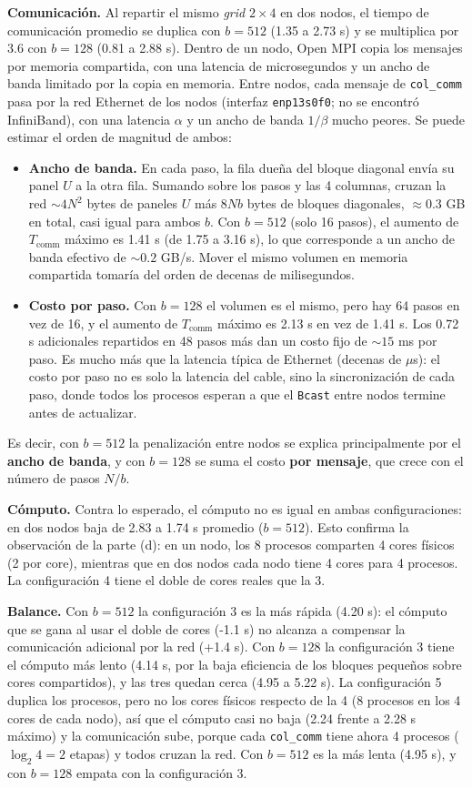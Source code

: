 \documentclass[11pt,a4paper]{article}
\newcommand{\Tcomm}{T_{\text{comm}}}
\begin{document}
\textbf{Comunicación.} Al repartir el mismo \emph{grid} $2\times4$ en dos nodos, el tiempo de comunicación promedio se duplica con $b=512$ (1.35 a 2.73 s) y se multiplica por 3.6 con $b=128$ (0.81 a 2.88 s). Dentro de un nodo, Open MPI copia los mensajes por memoria compartida, con una latencia de microsegundos y un ancho de banda limitado por la copia en memoria. Entre nodos, cada mensaje de \texttt{col\_comm} pasa por la red Ethernet de los nodos (interfaz \texttt{enp13s0f0}; no se encontró InfiniBand), con una latencia $\alpha$ y un ancho de banda $1/\beta$ mucho peores. Se puede estimar el orden de magnitud de ambos:
\begin{itemize}
  \item \textbf{Ancho de banda.} En cada paso, la fila dueña del bloque diagonal envía su panel $U$ a la otra fila. Sumando sobre los pasos y las 4 columnas, cruzan la red $\sim4N^2$ bytes de paneles $U$ más $8Nb$ bytes de bloques diagonales, $\approx0.3$ GB en total, casi igual para ambos $b$. Con $b=512$ (solo 16 pasos), el aumento de $\Tcomm$ máximo es 1.41 s (de 1.75 a 3.16 s), lo que corresponde a un ancho de banda efectivo de $\sim0.2$ GB/s. Mover el mismo volumen en memoria compartida tomaría del orden de decenas de milisegundos.
  \item \textbf{Costo por paso.} Con $b=128$ el volumen es el mismo, pero hay 64 pasos en vez de 16, y el aumento de $\Tcomm$ máximo es 2.13 s en vez de 1.41 s. Los 0.72 s adicionales repartidos en 48 pasos más dan un costo fijo de $\sim15$ ms por paso. Es mucho más que la latencia típica de Ethernet (decenas de $\mu$s): el costo por paso no es solo la latencia del cable, sino la sincronización de cada paso, donde todos los procesos esperan a que el \texttt{Bcast} entre nodos termine antes de actualizar.
\end{itemize}
Es decir, con $b=512$ la penalización entre nodos se explica principalmente por el \textbf{ancho de banda}, y con $b=128$ se suma el costo \textbf{por mensaje}, que crece con el número de pasos $N/b$.

\textbf{Cómputo.} Contra lo esperado, el cómputo no es igual en ambas configuraciones: en dos nodos baja de 2.83 a 1.74 s promedio ($b=512$). Esto confirma la observación de la parte (d): en un nodo, los 8 procesos comparten 4 cores físicos (2 por core), mientras que en dos nodos cada nodo tiene 4 cores para 4 procesos. La configuración 4 tiene el doble de cores reales que la 3.

\textbf{Balance.} Con $b=512$ la configuración 3 es la más rápida (4.20 s): el cómputo que se gana al usar el doble de cores (-1.1 s) no alcanza a compensar la comunicación adicional por la red (+1.4 s). Con $b=128$ la configuración 3 tiene el cómputo más lento (4.14 s, por la baja eficiencia de los bloques pequeños sobre cores compartidos), y las tres quedan cerca (4.95 a 5.22 s). La configuración 5 duplica los procesos, pero no los cores físicos respecto de la 4 (8 procesos en los 4 cores de cada nodo), así que el cómputo casi no baja (2.24 frente a 2.28 s máximo) y la comunicación sube, porque cada \texttt{col\_comm} tiene ahora 4 procesos ($\log_2 4=2$ etapas) y todos cruzan la red. Con $b=512$ es la más lenta (4.95 s), y con $b=128$ empata con la configuración 3.
\end{document}
